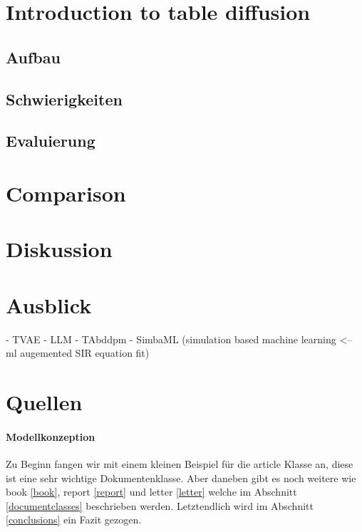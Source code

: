 \documentclass{article}
\begin{document}
\section{Introduction to table diffusion}
\subsection{Aufbau}
\subsection{Schwierigkeiten}
\subsection{Evaluierung}

\section{Comparison}

\section{Diskussion}

\section{Ausblick}
- TVAE
- LLM
- TAbddpm
- SimbaML (simulation based machine learning <-- ml augemented SIR equation fit)

\section{Quellen}

\paragraph{Modellkonzeption}
Zu Beginn fangen wir mit einem kleinen Beispiel f\"ur die article Klasse an,
diese ist eine sehr wichtige Dokumentenklasse. Aber daneben gibt es noch
weitere wie book \ref{book}, report \ref{report} und letter \ref{letter} 
welche im Abschnitt \ref{documentclasses} beschrieben werden. Letztendlich 
wird im Abschnitt \ref{conclusions} ein Fazit gezogen.



\end{document}
